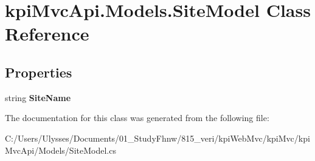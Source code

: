 \hypertarget{classkpi_mvc_api_1_1_models_1_1_site_model}{}\section{kpi\+Mvc\+Api.\+Models.\+Site\+Model Class Reference}
\label{classkpi_mvc_api_1_1_models_1_1_site_model}
\subsection*{Properties}
\begin{DoxyCompactItemize}
\item 
\mbox{\label{classkpi_mvc_api_1_1_models_1_1_site_model_a0c8f6aecaf586bf6f3d800392168e149}} 
string {\bfseries Site\+Name}
\end{DoxyCompactItemize}


The documentation for this class was generated from the following file\+:\begin{DoxyCompactItemize}
\item 
C\+:/\+Users/\+Ulysses/\+Documents/01\+\_\+\+Study\+Fhnw/815\+\_\+veri/kpi\+Web\+Mvc/kpi\+Mvc/kpi\+Mvc\+Api/\+Models/Site\+Model.\+cs\end{DoxyCompactItemize}
